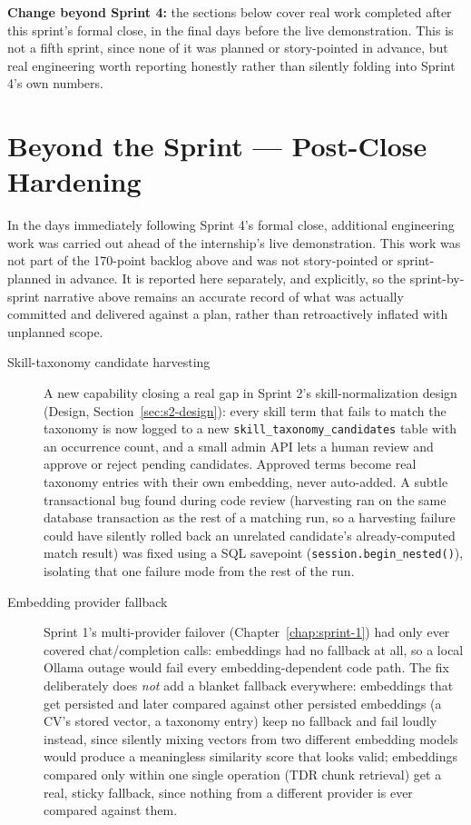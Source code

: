 \textbf{Change beyond Sprint 4:} the sections below cover real work
completed after this sprint's formal close, in the final days before the
live demonstration. This is not a fifth sprint, since none of it was
planned or story-pointed in advance, but real engineering worth
reporting honestly rather than silently folding into Sprint 4's own
numbers.

\section{Beyond the Sprint --- Post-Close Hardening}
\label{sec:post-sprint-hardening}

In the days immediately following Sprint 4's formal close, additional
engineering work was carried out ahead of the internship's live
demonstration. This work was not part of the 170-point backlog above and
was not story-pointed or sprint-planned in advance. It is reported here
separately, and explicitly, so the sprint-by-sprint narrative above
remains an accurate record of what was actually committed and delivered
against a plan, rather than retroactively inflated with unplanned scope.

\begin{description}
  \item[Skill-taxonomy candidate harvesting] A new capability closing a
    real gap in Sprint 2's skill-normalization design (Design,
    Section~\ref{sec:s2-design}): every skill term that fails to match
    the taxonomy is now logged to a new \texttt{skill\_taxonomy\_candidates}
    table with an occurrence count, and a small admin API lets a human
    review and approve or reject pending candidates. Approved terms
    become real taxonomy entries with their own embedding, never
    auto-added. A subtle transactional bug found during code review
    (harvesting ran on the same database transaction as the rest of a
    matching run, so a harvesting failure could have silently rolled
    back an unrelated candidate's already-computed match result) was
    fixed using a SQL savepoint (\texttt{session.begin\_nested()}),
    isolating that one failure mode from the rest of the run.
  \item[Embedding provider fallback] Sprint 1's multi-provider failover
    (Chapter~\ref{chap:sprint-1}) had only ever covered chat/completion
    calls: embeddings had no fallback at all, so a local Ollama outage
    would fail every embedding-dependent code path. The fix
    deliberately does \emph{not} add a blanket fallback everywhere:
    embeddings that get persisted and later compared against other
    persisted embeddings (a CV's stored vector, a taxonomy entry) keep
    no fallback and fail loudly instead, since silently mixing vectors
    from two different embedding models would produce a meaningless
    similarity score that looks valid; embeddings compared only within
    one single operation (TDR chunk retrieval) get a real, sticky
    fallback, since nothing from a different provider is ever compared
    against them.
\end{description}

